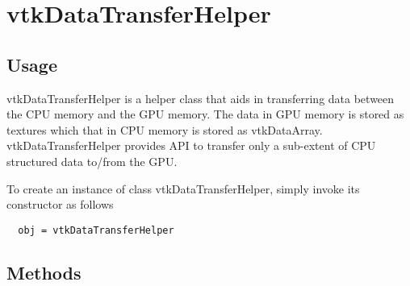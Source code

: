 \section{vtkDataTransferHelper}

\subsection{Usage}

  vtkDataTransferHelper is a helper class that aids in transferring data
  between the CPU memory and the GPU memory. The data in GPU memory is 
  stored as textures which that in CPU memory is stored as vtkDataArray.
  vtkDataTransferHelper provides API to transfer only a sub-extent of CPU
  structured data to/from the GPU.


To create an instance of class vtkDataTransferHelper, simply
invoke its constructor as follows
\begin{verbatim}
  obj = vtkDataTransferHelper
\end{verbatim}
\subsection{Methods}

